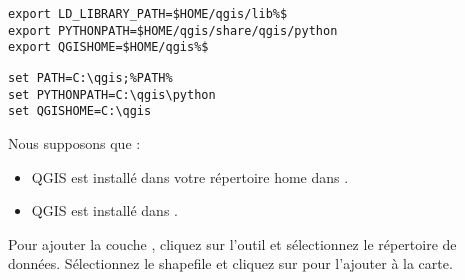 \nix{}\osx{}
\begin{verbatim}
export LD_LIBRARY_PATH=$HOME/qgis/lib%$
export PYTHONPATH=$HOME/qgis/share/qgis/python
export QGISHOME=$HOME/qgis%$
\end{verbatim}

\win{}
\begin{verbatim}
set PATH=C:\qgis;%PATH%
set PYTHONPATH=C:\qgis\python
set QGISHOME=C:\qgis
\end{verbatim}

Nous supposons que :
\begin{itemize}
\item\nix{}\osx{}QGIS est install\'e dans votre r\'epertoire home dans . 
\item\win{}QGIS est install\'e dans .
\end{itemize}


Pour ajouter la couche , cliquez sur l'outil  et s\'electionnez le r\'epertoire de donn\'ees. S\'electionnez le shapefile et cliquez sur  pour l'ajouter \`a la carte.


